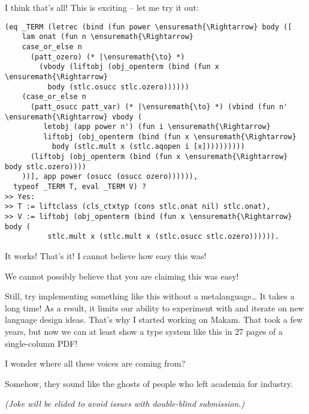 \heroSTUDENT{} I think that's all! This is exciting -- let me try it out:

\begin{verbatim}
(eq _TERM (letrec (bind (fun power \ensuremath{\Rightarrow} body ([
    lam onat (fun n \ensuremath{\Rightarrow}
    case_or_else n
      (patt_ozero) (* |\ensuremath{\to} *)
        (vbody (liftobj (obj_openterm (bind (fun x \ensuremath{\Rightarrow}
          body (stlc.osucc stlc.ozero))))))
    (case_or_else n
      (patt_osucc patt_var) (* |\ensuremath{\to} *) (vbind (fun n' \ensuremath{\Rightarrow} vbody (
         letobj (app power n') (fun i \ensuremath{\Rightarrow}
         liftobj (obj_openterm (bind (fun x \ensuremath{\Rightarrow}
           body (stlc.mult x (stlc.aqopen i [x])))))))))
      (liftobj (obj_openterm (bind (fun x \ensuremath{\Rightarrow} body stlc.ozero))))
    ))], app power (osucc (osucc ozero)))))),
  typeof _TERM T, eval _TERM V) ?
>> Yes:
>> T := liftclass (cls_ctxtyp (cons stlc.onat nil) stlc.onat),
>> V := liftobj (obj_openterm (bind (fun x \ensuremath{\Rightarrow} body (
          stlc.mult x (stlc.mult x (stlc.osucc stlc.ozero)))))).
\end{verbatim}

\noindent
It works! That's it! I cannot believe how easy this was!

\heroAUDIENCE{} We cannot possibly believe that you are claiming this was
easy!

\heroAUTHOR{} Still, try implementing something like this without a
metalanguage\ldots{} It takes a long time! As a result, it limits our
ability to experiment with and iterate on new language design ideas.
That's why I started working on Makam. That took a few years, but now we
can at least show a type system like this in 27 pages of a single-column
PDF!

\heroADVISOR{} I wonder where all these voices are coming from?

\heroSTUDENT{} Somehow, they sound like the ghosts of people who left academia
for industry.

\heroTODO{}
\textit{(Joke will be elided to avoid issues with double-blind submission.)}
